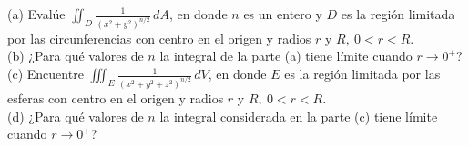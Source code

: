 \item (a) Evalúe $\iint_D \frac{1}{(x^2 + y^2)^{n/2}} \, dA$, en donde $n$ es un entero y $D$ es la región limitada por las circunferencias con centro en el origen y radios $r$ y $R, \ 0 < r < R$. \\
(b) ¿Para qué valores de $n$ la integral de la parte (a) tiene límite cuando $r \to 0^+$? \\
(c) Encuentre $\iiint_E \frac{1}{(x^2 + y^2 + z^2)^{n/2}} \, dV$, en donde $E$ es la región limitada por las esferas con centro en el origen y radios $r$ y $R, \ 0 < r < R$. \\
(d) ¿Para qué valores de $n$ la integral considerada en la parte (c) tiene límite cuando $r \to 0^+$?
